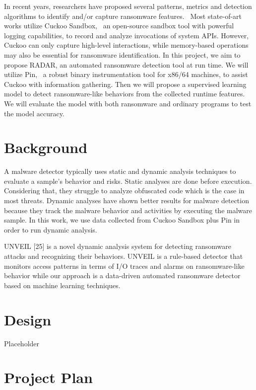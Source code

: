 \documentclass[letterpaper,twocolumn,10pt]{article}
\newcommand{\work}{\mbox{\textsc{RADAR}}\xspace}
\begin{document}
In recent years, researchers have proposed several patterns, metrics and detection algorithms to identify and/or capture ransomware features.~\cite{Chen2019AutomatedRB, 8051108, Morat2018RansomwareED, Verma2018DefiningAM}
Most state-of-art works utilize Cuckoo Sandbox,~\cite{CuckooSS} an open-source sandbox tool with powerful logging capabilities, to record and analyze invocations of system APIs.
However, Cuckoo can only capture high-level interactions, while memory-based operations may also be essential for ransomware identification.
In this project, we aim to propose \work, an automated ransomware detection tool at run time.
We will utilize Pin,~\cite{pin} a robust binary instrumentation tool for x86/64 machines, to assist Cuckoo with information gathering.
Then we will propose a supervised learning model to detect ransomware-like behaviors from the collected runtime features.
We will evaluate the model with both ransomware and ordinary programs to test the model accuracy.

\section{Background}

A malware detector typically uses static and dynamic analysis techniques to evaluate a sample's behavior and risks. Static analyses are done before execution. Considering that, they struggle to analyze obfuscated code which is the case in most threats. Dynamic analyses have shown better results for malware detection because they track the malware behavior and activities by executing the malware sample. In this work, we use data collected from Cuckoo Sandbox plus Pin in order to run dynamic analysis. 

UNVEIL [25] is a novel dynamic analysis system for detecting ransomware attacks and recognizing their behaviors. UNVEIL is a rule-based detector that monitors access patterns in terms of I/O traces and alarms on ransomware-like behavior while our approach is a data-driven automated ransomware detector based on machine learning techniques.

\section{Design}

Placeholder

\section{Project Plan}
\end{document}
